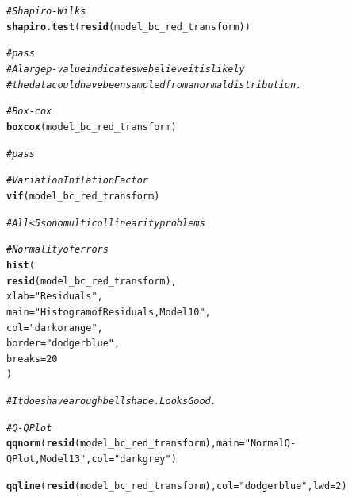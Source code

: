 \documentclass{article}\usepackage[]{graphicx}\usepackage[]{color}
\makeatletter
\newcommand{\hlnum}[1]{\textcolor[rgb]{0.686,0.059,0.569}{#1}}%
\newcommand{\hlstr}[1]{\textcolor[rgb]{0.192,0.494,0.8}{#1}}%
\newcommand{\hlcom}[1]{\textcolor[rgb]{0.678,0.584,0.686}{\textit{#1}}}%
\newcommand{\hlstd}[1]{\textcolor[rgb]{0.345,0.345,0.345}{#1}}%
\newcommand{\hlkwc}[1]{\textcolor[rgb]{0.333,0.667,0.333}{#1}}%
\newcommand{\hlkwd}[1]{\textcolor[rgb]{0.737,0.353,0.396}{\textbf{#1}}}%
\newenvironment{kframe}{%
 \def\at@end@of@kframe{}%
 \ifinner\ifhmode%
  \def\at@end@of@kframe{\end{minipage}}%
  \begin{minipage}{\columnwidth}%
 \fi\fi%
 \def\FrameCommand##1{\hskip\@totalleftmargin \hskip-\fboxsep
 \colorbox{shadecolor}{##1}\hskip-\fboxsep
     \hskip-\linewidth \hskip-\@totalleftmargin \hskip\columnwidth}%
 \MakeFramed {\advance\hsize-\width
   \@totalleftmargin\z@ \linewidth\hsize
   \@setminipage}}%
 {\par\unskip\endMakeFramed%
 \at@end@of@kframe}
\newenvironment{knitrout}{}{} %
\makeatother
\begin{document}
\begin{knitrout}
\begin{kframe}
\begin{alltt}
\hlcom{# Shapiro-Wilks}
\hlkwd{shapiro.test}\hlstd{(}\hlkwd{resid}\hlstd{(model_bc_red_transform))}
\end{alltt}


{\ttfamily\noindent\bfseries\color{errorcolor}{\#\# Error in resid(model\_bc\_red\_transform): object 'model\_bc\_red\_transform' not found}}\begin{alltt}
\hlcom{# pass}
\hlcom{# A large p-value indicates we believe it is likely}
\hlcom{# the data could have been sampled from a normal distribution.}

\hlcom{# Box-cox}
\hlkwd{boxcox}\hlstd{(model_bc_red_transform)}
\end{alltt}


{\ttfamily\noindent\bfseries\color{errorcolor}{\#\# Error in boxcox(model\_bc\_red\_transform): object 'model\_bc\_red\_transform' not found}}\begin{alltt}
\hlcom{# pass}

\hlcom{# Variation Inflation Factor}
\hlkwd{vif}\hlstd{(model_bc_red_transform)}
\end{alltt}


{\ttfamily\noindent\bfseries\color{errorcolor}{\#\# Error in vif(model\_bc\_red\_transform): object 'model\_bc\_red\_transform' not found}}\begin{alltt}
\hlcom{# All <5 so no multicollinearity problems}

\hlcom{# Normality of errors}
\hlkwd{hist}\hlstd{(}
  \hlkwd{resid}\hlstd{(model_bc_red_transform),}
  \hlkwc{xlab}   \hlstd{=} \hlstr{"Residuals"}\hlstd{,}
  \hlkwc{main}   \hlstd{=} \hlstr{"Histogram of Residuals, Model 10"}\hlstd{,}
  \hlkwc{col}    \hlstd{=} \hlstr{"darkorange"}\hlstd{,}
  \hlkwc{border} \hlstd{=} \hlstr{"dodgerblue"}\hlstd{,}
  \hlkwc{breaks} \hlstd{=} \hlnum{20}
\hlstd{)}
\end{alltt}


{\ttfamily\noindent\bfseries\color{errorcolor}{\#\# Error in resid(model\_bc\_red\_transform): object 'model\_bc\_red\_transform' not found}}\begin{alltt}
\hlcom{# It does have a rough bell shape. Looks Good.}

\hlcom{# Q-Q Plot}
\hlkwd{qqnorm}\hlstd{(}\hlkwd{resid}\hlstd{(model_bc_red_transform),} \hlkwc{main} \hlstd{=} \hlstr{"Normal Q-Q Plot, Model 13"}\hlstd{,} \hlkwc{col} \hlstd{=} \hlstr{"darkgrey"}\hlstd{)}
\end{alltt}


{\ttfamily\noindent\bfseries\color{errorcolor}{\#\# Error in resid(model\_bc\_red\_transform): object 'model\_bc\_red\_transform' not found}}\begin{alltt}
\hlkwd{qqline}\hlstd{(}\hlkwd{resid}\hlstd{(model_bc_red_transform),} \hlkwc{col} \hlstd{=} \hlstr{"dodgerblue"}\hlstd{,} \hlkwc{lwd} \hlstd{=} \hlnum{2}\hlstd{)}
\end{alltt}



\end{kframe}
\end{knitrout}
\end{document}
